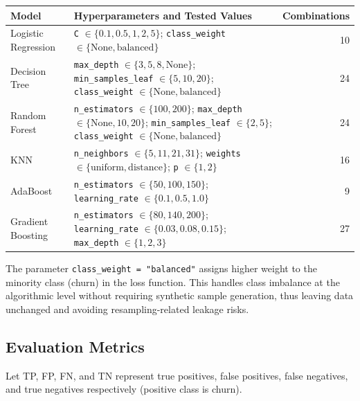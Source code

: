 \begin{center}
\small
\begin{tabularx}{\textwidth}{l X r}
\toprule
\textbf{Model} & \textbf{Hyperparameters and Tested Values} & \textbf{Combinations} \\
\midrule
Logistic Regression & \texttt{C} $\in \{0.1, 0.5, 1, 2, 5\}$; \texttt{class\_weight} $\in \{\text{None}, \text{balanced}\}$ & 10 \\
\addlinespace
Decision Tree & \texttt{max\_depth} $\in \{3, 5, 8, \text{None}\}$; \texttt{min\_samples\_leaf} $\in \{5, 10, 20\}$; \texttt{class\_weight} $\in \{\text{None}, \text{balanced}\}$ & 24 \\
\addlinespace
Random Forest & \texttt{n\_estimators} $\in \{100, 200\}$; \texttt{max\_depth} $\in \{\text{None}, 10, 20\}$; \texttt{min\_samples\_leaf} $\in \{2, 5\}$; \texttt{class\_weight} $\in \{\text{None}, \text{balanced}\}$ & 24 \\
\addlinespace
KNN & \texttt{n\_neighbors} $\in \{5, 11, 21, 31\}$; \texttt{weights} $\in \{\text{uniform}, \text{distance}\}$; \texttt{p} $\in \{1, 2\}$ & 16 \\
\addlinespace
AdaBoost & \texttt{n\_estimators} $\in \{50, 100, 150\}$; \texttt{learning\_rate} $\in \{0.1, 0.5, 1.0\}$ & 9 \\
\addlinespace
Gradient Boosting & \texttt{n\_estimators} $\in \{80, 140, 200\}$; \texttt{learning\_rate} $\in \{0.03, 0.08, 0.15\}$; \texttt{max\_depth} $\in \{1, 2, 3\}$ & 27 \\
\bottomrule
\end{tabularx}
\end{center}

The parameter \texttt{class\_weight = "balanced"} assigns higher weight to the minority class (churn) in the loss function. This handles class imbalance at the algorithmic level without requiring synthetic sample generation, thus leaving data unchanged and avoiding resampling-related leakage risks.

\subsection{ Evaluation Metrics}

Let TP, FP, FN, and TN represent true positives, false positives, false negatives, and true negatives respectively (positive class is churn).

